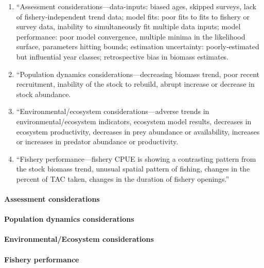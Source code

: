 \documentclass[
  11pt,
]{article}
\providecommand{\tightlist}{%
  \setlength{\itemsep}{0pt}\setlength{\parskip}{0pt}}
\begin{document}
\begin{enumerate}
\def\labelenumi{\arabic{enumi}.}
\tightlist
\item
  ``Assessment considerations---data-inputs: biased ages, skipped surveys, lack of fishery-independent trend data; model fits: poor fits to fits to fishery or survey data, inability to simultaneously fit multiple data inputs; model performance: poor model convergence, multiple minima in the likelihood surface, parameters hitting bounds; estimation uncertainty: poorly-estimated but influential year classes; retrospective bias in biomass estimates.
\item
  ``Population dynamics considerations---decreasing biomass trend, poor recent recruitment, inability of the stock to rebuild, abrupt increase or decrease in stock abundance.
\item
  ``Environmental/ecosystem considerations---adverse trends in environmental/ecosystem indicators, ecosystem model results, decreases in ecosystem productivity, decreases in prey abundance or availability, increases or increases in predator abundance or productivity.
\item
  ``Fishery performance---fishery CPUE is showing a contrasting pattern from the stock biomass trend, unusual spatial pattern of fishing, changes in the percent of TAC taken, changes in the duration of fishery openings.''
\end{enumerate}

\hypertarget{assessment-considerations}{%
\paragraph{Assessment considerations}\label{assessment-considerations}}

\hypertarget{population-dynamics-considerations}{%
\paragraph{Population dynamics considerations}\label{population-dynamics-considerations}}

\hypertarget{environmentalecosystem-considerations}{%
\paragraph{Environmental/Ecosystem considerations}\label{environmentalecosystem-considerations}}

\hypertarget{fishery-performance}{%
\paragraph{Fishery performance}\label{fishery-performance}}
\end{document}
